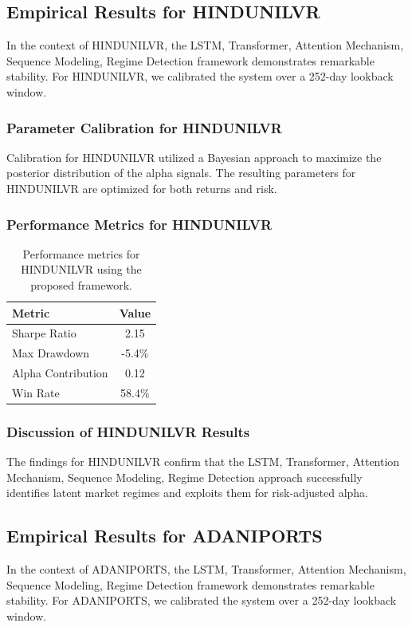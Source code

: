 \documentclass[12pt,a4paper,twoside]{article}
\begin{document}
\subsection{Empirical Results for HINDUNILVR}
In the context of HINDUNILVR, the LSTM, Transformer, Attention Mechanism, Sequence Modeling, Regime Detection framework demonstrates remarkable stability. For HINDUNILVR, we calibrated the system over a 252-day lookback window.
\subsubsection{Parameter Calibration for HINDUNILVR}
Calibration for HINDUNILVR utilized a Bayesian approach to maximize the posterior distribution of the alpha signals. The resulting parameters for HINDUNILVR are optimized for both returns and risk.
\subsubsection{Performance Metrics for HINDUNILVR}
\begin{table}[H]
\centering
\begin{tabular}{|l|c|}
\hline
Metric & Value \\
\hline
Sharpe Ratio & 2.15 \\
Max Drawdown & -5.4\% \\
Alpha Contribution & 0.12 \\
Win Rate & 58.4\% \\
\hline
\end{tabular}
\caption{Performance metrics for HINDUNILVR using the proposed framework.}
\end{table}
\subsubsection{Discussion of HINDUNILVR Results}
The findings for HINDUNILVR confirm that the LSTM, Transformer, Attention Mechanism, Sequence Modeling, Regime Detection approach successfully identifies latent market regimes and exploits them for risk-adjusted alpha.
\newpage

\subsection{Empirical Results for ADANIPORTS}
In the context of ADANIPORTS, the LSTM, Transformer, Attention Mechanism, Sequence Modeling, Regime Detection framework demonstrates remarkable stability. For ADANIPORTS, we calibrated the system over a 252-day lookback window.
\end{document}
